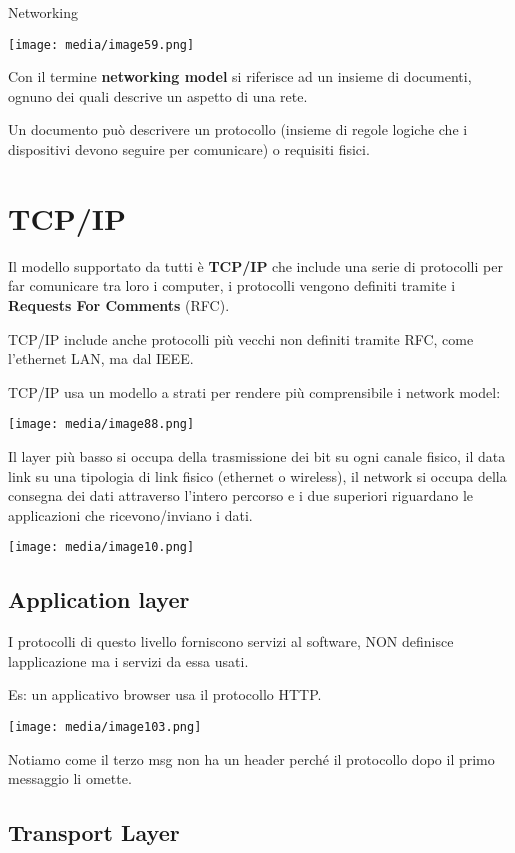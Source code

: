 Networking

\texttt{[image: media/image59.png]}

Con il termine \textbf{networking model} si riferisce ad un insieme di
documenti, ognuno dei quali descrive un aspetto di una rete.

Un documento può descrivere un protocollo (insieme di regole logiche che
i dispositivi devono seguire per comunicare) o requisiti fisici.

\section{TCP/IP}\label{tcpip}

Il modello supportato da tutti è \textbf{TCP/IP} che include una serie
di protocolli per far comunicare tra loro i computer, i protocolli
vengono definiti tramite i \textbf{Requests For Comments} (RFC).

TCP/IP include anche protocolli più vecchi non definiti tramite RFC,
come l'ethernet LAN, ma dal IEEE.

TCP/IP usa un modello a strati per rendere più comprensibile i network
model:

\texttt{[image: media/image88.png]}

Il layer più basso si occupa della trasmissione dei bit su ogni canale
fisico, il data link su una tipologia di link fisico (ethernet o
wireless), il network si occupa della consegna dei dati attraverso
l'intero percorso e i due superiori riguardano le applicazioni che
ricevono/inviano i dati.

\texttt{[image: media/image10.png]}

\subsection{Application layer}\label{application-layer}

I protocolli di questo livello forniscono servizi al software, NON
definisce l\textquotesingle applicazione ma i servizi da essa usati.

Es: un applicativo browser usa il protocollo HTTP.

\texttt{[image: media/image103.png]}

Notiamo come il terzo msg non ha un header perché il protocollo dopo il
primo messaggio li omette.

\subsection{Transport Layer}\label{transport-layer}

